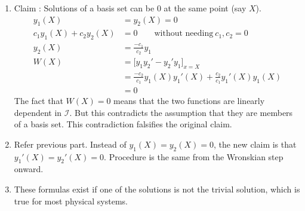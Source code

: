 \begin{enumerate}
\begin{enumerate}
              \item Claim : Solutions of a basis set can be $ 0 $ at the same point (say $ X $).
                    \begin{align}
                        y_{1}(X)                      & = y_{2}(X) = 0                                                                 \\
                        c_{1}y_{1}(X) + c_{2}y_{2}(X) & = 0 \qquad \text{without needing}\ c_{1}, c_{2} = 0                            \\
                        y_{2}(X)                      & = \frac{-c_{1}}{c_{2}}y_{1}                                                    \\
                        W(X)                          & =  \Bigg[ y_{1}y_{2}' - y_{2}'y_{1} \Bigg]_{x = X}                             \\
                                                      & = \frac{-c_{2}}{c_{1}}y_{1}(X)y_{1}'(X) + \frac{c_{2}}{c_{1}}y_{1}'(X)y_{1}(X) \\
                                                      & = 0
                    \end{align}
                    The fact that $ W(X) = 0 $ means that the two functions are linearly dependent
                    in $ \mathcal{I} $. But this contradicts the assumption that they are members of a
                    basis set. This contradiction falsifies the original claim.

              \item Refer previous part. Instead of $ y_{1}(X) = y_{2}(X) = 0 $, the new claim is that
                    $ y_{1}'(X) = y_{2}'(X) = 0 $. Procedure is the same from the Wronskian step onward.

              \item These formulas exist if one of the solutions is not the trivial solution,
                    which is true for most physical systems.


\end{enumerate}
\end{enumerate}
